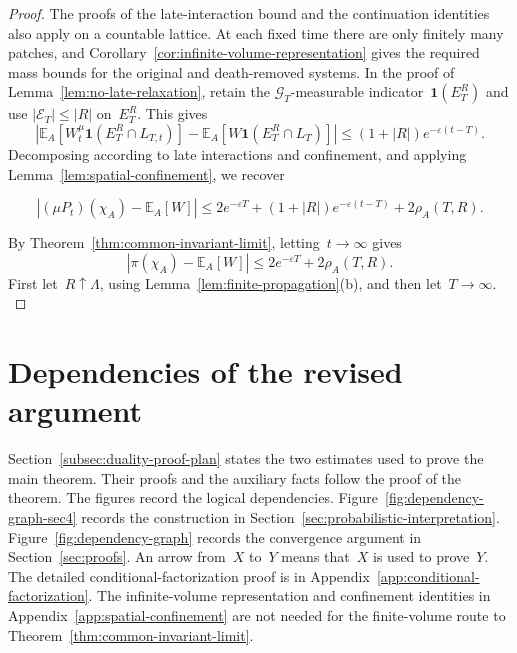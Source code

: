 \documentclass[EJP,preprint,NODS,nobera]{ejpecp}
\newcommand{\E}{\mathbb{E}}
\newcommand{\bb}[1]{\left(#1\right)}
\newcommand{\Cb}[1]{\left[#1\right]}
\newcommand{\abs}[1]{\left|#1\right|}
\newcommand{\ind}{\mathbf{1}}
\newcommand{\rev}[1]{{\color{red}#1}}
\begin{document}
\begin{proof}

{\color{red}
The proofs of the late-interaction bound and the continuation identities
also apply on a countable lattice. At each fixed time there are only finitely
many patches, and Corollary~\ref{cor:infinite-volume-representation} gives
the required mass bounds for the original and death-removed systems.
In the proof of Lemma~\ref{lem:no-late-relaxation}, retain the
$\mathcal G_T$-measurable indicator~$\ind(E_T^R)$ and use
$\abs{\mathcal E_T}\leq\abs R$ on~$E_T^R$. This gives
\begin{equation*}
\abs{
\E_A\Cb{W_t^\mu\ind\bb{E_T^R\cap L_{T,t}}}
-\E_A\Cb{W\ind\bb{E_T^R\cap L_T}}
}
\leq(1+\abs R)e^{-\varepsilon(t-T)}.
\end{equation*}
Decomposing according to late interactions and confinement, and applying
Lemma~\ref{lem:spatial-confinement}, we recover
}

\begin{equation}
\label{eq:three-term-convergence-bound}
\abs{(\mu P_t)(\chi_A)-\E_A\Cb{W}}
\leq
2e^{-\varepsilon T}
+
\bb{1+\abs R}e^{-\varepsilon\bb{t-T}}
+
2\rho_A(T,R).
\end{equation}

{\color{red}
By Theorem~\ref{thm:common-invariant-limit}, letting~$t\to\infty$ gives
\begin{equation*}
\abs{\pi(\chi_A)-\E_A\Cb W}
\leq2e^{-\varepsilon T}+2\rho_A(T,R).
\end{equation*}
First let~$R\uparrow\Lambda$, using Lemma~\ref{lem:finite-propagation}(b),
and then let~$T\to\infty$.
}

\end{proof}

\section{\texorpdfstring{\rev{Dependencies of the revised argument}}{Dependencies of the revised argument}}
\label{app:dependencies}

\rev{Section~\ref{subsec:duality-proof-plan} states the two estimates used
to prove the main theorem. Their proofs and the auxiliary facts follow the
proof of the theorem. The figures record the logical dependencies.
Figure~\ref{fig:dependency-graph-sec4} records the construction in Section~\ref{sec:probabilistic-interpretation}.
Figure~\ref{fig:dependency-graph} records the convergence argument in Section~\ref{sec:proofs}.
An arrow from~$X$ to~$Y$ means that~$X$ is used to prove~$Y$.
The detailed conditional-factorization proof is in Appendix~\ref{app:conditional-factorization}.
The infinite-volume representation and confinement identities in
Appendix~\ref{app:spatial-confinement} are not needed for the finite-volume
route to Theorem~\ref{thm:common-invariant-limit}.}
\end{document}
